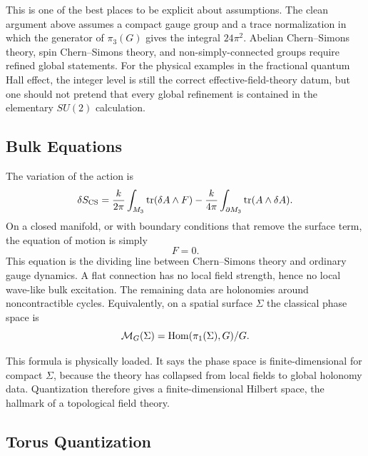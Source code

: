 This is one of the best places to be explicit about assumptions. The clean argument above assumes a compact gauge group and a trace normalization in which the generator of $\pi_3(G)$ gives the integral $24\pi^2$. Abelian Chern--Simons theory, spin Chern--Simons theory, and non-simply-connected groups require refined global statements. For the physical examples in the fractional quantum Hall effect, the integer level is still the correct effective-field-theory datum, but one should not pretend that every global refinement is contained in the elementary $SU(2)$ calculation.

\subsection{Bulk Equations}
\label{subsec:synthesis-flatness}

The variation of the action is
\begin{equation}
  \delta S_{\operatorname{CS}}
  =
  \frac{k}{2\pi}\int_{M_3}\operatorname{tr}(\delta A\wedge F)
  -
  \frac{k}{4\pi}\int_{\partial M_3}\operatorname{tr}(A\wedge\delta A).
  \label{eq:synthesis-variation}
\end{equation}
On a closed manifold, or with boundary conditions that remove the surface term, the equation of motion is simply
\begin{equation}
  F=0.
  \label{eq:synthesis-flatness}
\end{equation}
This equation is the dividing line between Chern--Simons theory and ordinary gauge dynamics. A flat connection has no local field strength, hence no local wave-like bulk excitation. The remaining data are holonomies around noncontractible cycles. Equivalently, on a spatial surface $\Sigma$ the classical phase space is
\begin{equation}
  \mathcal M_G(\Sigma)
  =
  \operatorname{Hom}(\pi_1(\Sigma),G)/G.
  \label{eq:synthesis-moduli}
\end{equation}

This formula is physically loaded. It says the phase space is finite-dimensional for compact $\Sigma$, because the theory has collapsed from local fields to global holonomy data. Quantization therefore gives a finite-dimensional Hilbert space, the hallmark of a topological field theory.


\subsection{Torus Quantization}
\label{subsec:synthesis-u1-torus}

